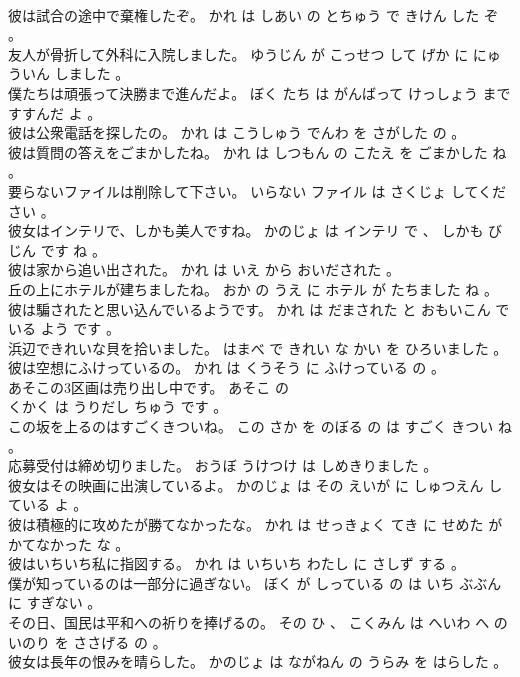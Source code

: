 \documentclass[8pt]{extreport}
\begin{document}
\begin{CJK}{UTF8}{min}
\\	彼は試合の途中で棄権したぞ。	かれ は しあい の とちゅう で きけん した ぞ 。 
\\	友人が骨折して外科に入院しました。	ゆうじん が こっせつ して げか に にゅういん しました 。 
\\	僕たちは頑張って決勝まで進んだよ。	ぼく たち は がんばって けっしょう まで すすんだ よ 。 
\\	彼は公衆電話を探したの。	かれ は こうしゅう でんわ を さがした の 。 
\\	彼は質問の答えをごまかしたね。	かれ は しつもん の こたえ を ごまかした ね 。 
\\	要らないファイルは削除して下さい。	いらない ファイル は さくじょ してください 。 
\\	彼女はインテリで、しかも美人ですね。	かのじょ は インテリ で 、 しかも びじん です ね 。 
\\	彼は家から追い出された。	かれ は いえ から おいだされた 。 
\\	丘の上にホテルが建ちましたね。	おか の うえ に ホテル が たちました ね 。 
\\	彼は騙されたと思い込んでいるようです。	かれ は だまされた と おもいこん でいる よう です 。 
\\	浜辺できれいな貝を拾いました。	はまべ で きれい な かい を ひろいました 。 
\\	彼は空想にふけっているの。	かれ は くうそう に ふけっている の 。 
\\	あそこの3区画は売り出し中です。	あそこ の 
\\	くかく は うりだし ちゅう です 。 
\\	この坂を上るのはすごくきついね。	この さか を のぼる の は すごく きつい ね 。 
\\	応募受付は締め切りました。	おうぼ うけつけ は しめきりました 。 
\\	彼女はその映画に出演しているよ。	かのじょ は その えいが に しゅつえん している よ 。 
\\	彼は積極的に攻めたが勝てなかったな。	かれ は せっきょく てき に せめた が かてなかった な 。 
\\	彼はいちいち私に指図する。	かれ は いちいち わたし に さしず する 。 
\\	僕が知っているのは一部分に過ぎない。	ぼく が しっている の は いち ぶぶん に すぎない 。 
\\	その日、国民は平和への祈りを捧げるの。	その ひ 、 こくみん は へいわ へ の いのり を ささげる の 。 
\\	彼女は長年の恨みを晴らした。	かのじょ は ながねん の うらみ を はらした 。 

\end{CJK}
\end{document}
